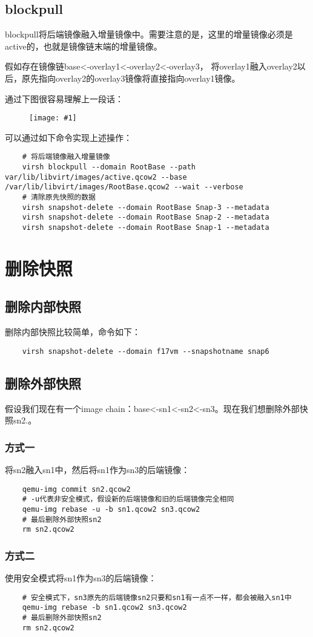 \documentclass[a4paper,left=1.5cm,right=1.5cm,11pt]{article}
\newcommand{\fic}[1]{\begin{figure}[H]
		\center
		\texttt{[image: \#1]}
	\end{figure}}
\begin{document}
\subsection{blockpull}
    blockpull将后端镜像融入增量镜像中。需要注意的是，这里的增量镜像必须是active的，也就是镜像链末端的增量镜像。\par

    假如存在镜像链base<-overlay1<-overlay2<-overlay3，
    将overlay1融入overlay2以后，原先指向overlay2的overlay3镜像将直接指向overlay1镜像。\par

    通过下图很容易理解上一段话：
    \fic{5.png}

    可以通过如下命令实现上述操作：
    \begin{lstlisting}
    # 将后端镜像融入增量镜像
    virsh blockpull --domain RootBase --path var/lib/libvirt/images/active.qcow2 --base /var/lib/libvirt/images/RootBase.qcow2 --wait --verbose
    # 清除原先快照的数据
    virsh snapshot-delete --domain RootBase Snap-3 --metadata
    virsh snapshot-delete --domain RootBase Snap-2 --metadata
    virsh snapshot-delete --domain RootBase Snap-1 --metadata
    \end{lstlisting}

\clearpage

\section{删除快照}
\subsection{删除内部快照}
    删除内部快照比较简单，命令如下：
    \begin{lstlisting}
    virsh snapshot-delete --domain f17vm --snapshotname snap6
    \end{lstlisting}

\subsection{删除外部快照}
    假设我们现在有一个image chain：base<-sn1<-sn2<-sn3。现在我们想删除外部快照sn2.。

\subsubsection{方式一}
    将sn2融入sn1中，然后将sn1作为sn3的后端镜像：
    \begin{lstlisting}
    qemu-img commit sn2.qcow2
    # -u代表非安全模式，假设新的后端镜像和旧的后端镜像完全相同
    qemu-img rebase -u -b sn1.qcow2 sn3.qcow2
    # 最后删除外部快照sn2
    rm sn2.qcow2
    \end{lstlisting}

\subsubsection{方式二}
    使用安全模式将sn1作为sn3的后端镜像：
    \begin{lstlisting}
    # 安全模式下，sn3原先的后端镜像sn2只要和sn1有一点不一样，都会被融入sn1中
    qemu-img rebase -b sn1.qcow2 sn3.qcow2
    # 最后删除外部快照sn2
    rm sn2.qcow2
    \end{lstlisting}
\end{document}
